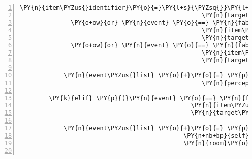 \begin{Verbatim}[commandchars=\\\{\},numbers=left,firstnumber=1,stepnumber=1]
                                                  \PY{n}{item\PYZus{}identifier}\PY{o}{=}\PY{l+s}{\PYZsq{}}\PY{l+s}{dew}\PY{l+s}{\PYZsq{}}\PY{p}{,}
                                                  \PY{n}{target\PYZus{}identifier}\PY{o}{=}\PY{l+s}{\PYZsq{}}\PY{l+s}{teleport\PYZus{}entry}\PY{l+s}{\PYZsq{}}\PY{p}{)}
              \PY{o+ow}{or} \PY{n}{event} \PY{o}{==} \PY{n}{fabula}\PY{o}{.}\PY{n}{TriesToDropEvent}\PY{p}{(}\PY{n}{identifier}\PY{o}{=}\PY{n}{ID\PYZus{}KUNI}\PY{p}{,}
                                                  \PY{n}{item\PYZus{}identifier}\PY{o}{=}\PY{l+s}{\PYZsq{}}\PY{l+s}{string\PYZus{}harp}\PY{l+s}{\PYZsq{}}\PY{p}{,}
                                                  \PY{n}{target\PYZus{}identifier}\PY{o}{=}\PY{l+s}{\PYZsq{}}\PY{l+s}{teleport\PYZus{}default}\PY{l+s}{\PYZsq{}}\PY{p}{)}
              \PY{o+ow}{or} \PY{n}{event} \PY{o}{==} \PY{n}{fabula}\PY{o}{.}\PY{n}{TriesToDropEvent}\PY{p}{(}\PY{n}{identifier}\PY{o}{=}\PY{n}{ID\PYZus{}KUNI}\PY{p}{,}
                                                  \PY{n}{item\PYZus{}identifier}\PY{o}{=}\PY{l+s}{\PYZsq{}}\PY{l+s}{string\PYZus{}harp}\PY{l+s}{\PYZsq{}}\PY{p}{,}
                                                  \PY{n}{target\PYZus{}identifier}\PY{o}{=}\PY{l+s}{\PYZsq{}}\PY{l+s}{teleport\PYZus{}entry}\PY{l+s}{\PYZsq{}}\PY{p}{)}\PY{p}{)}\PY{p}{:}

            \PY{n}{event\PYZus{}list} \PY{o}{+}\PY{o}{=} \PY{p}{[}\PY{n}{fabula}\PY{o}{.}\PY{n}{PerceptionEvent}\PY{p}{(}\PY{n}{identifier}\PY{o}{=}\PY{n}{ID\PYZus{}KUNI}\PY{p}{,}
                                                  \PY{n}{perception}\PY{o}{=}\PY{l+s}{\PYZsq{}}\PY{l+s}{Das möchte ich hier nicht ablegen.}\PY{l+s}{\PYZsq{}}\PY{p}{)}\PY{p}{]}

        \PY{k}{elif} \PY{p}{(}\PY{n}{event} \PY{o}{==} \PY{n}{fabula}\PY{o}{.}\PY{n}{TriesToDropEvent}\PY{p}{(}\PY{n}{identifier}\PY{o}{=}\PY{n}{ID\PYZus{}KUNI}\PY{p}{,}
                                               \PY{n}{item\PYZus{}identifier}\PY{o}{=}\PY{l+s}{\PYZsq{}}\PY{l+s}{goblet\PYZus{}filled}\PY{l+s}{\PYZsq{}}\PY{p}{,}
                                               \PY{n}{target\PYZus{}identifier}\PY{o}{=}\PY{l+s}{\PYZsq{}}\PY{l+s}{elf}\PY{l+s}{\PYZsq{}}\PY{p}{)}\PY{p}{)}\PY{p}{:}

            \PY{n}{event\PYZus{}list} \PY{o}{+}\PY{o}{=} \PY{p}{[}\PY{n}{fabula}\PY{o}{.}\PY{n}{DropsEvent}\PY{p}{(}\PY{n}{ID\PYZus{}KUNI}\PY{p}{,}
                                             \PY{n+nb+bp}{self}\PY{o}{.}\PY{n}{host}\PY{o}{.}\PY{n}{rack}\PY{o}{.}\PY{n}{entity\PYZus{}dict}\PY{p}{[}\PY{l+s}{\PYZsq{}}\PY{l+s}{goblet\PYZus{}filled}\PY{l+s}{\PYZsq{}}\PY{p}{]}\PY{p}{,}
                                             \PY{n}{room}\PY{o}{.}\PY{n}{entity\PYZus{}locations}\PY{p}{[}\PY{l+s}{\PYZsq{}}\PY{l+s}{elf}\PY{l+s}{\PYZsq{}}\PY{p}{]}\PY{p}{)}\PY{p}{]}


\end{Verbatim}
